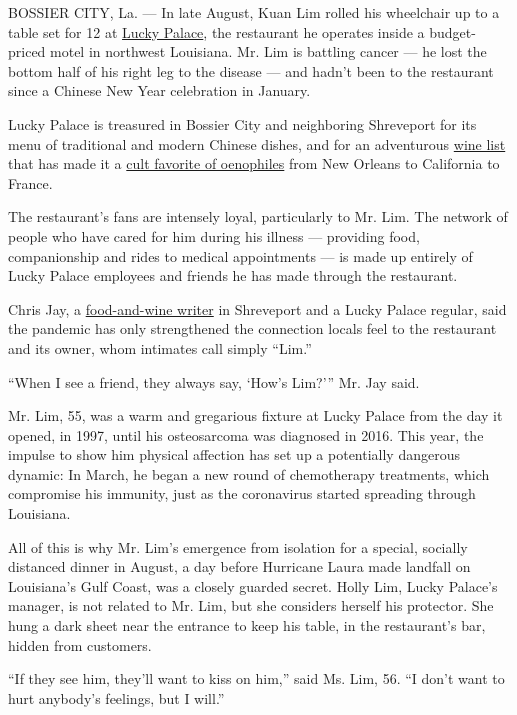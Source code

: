 BOSSIER CITY, La. --- In late August, Kuan Lim rolled his wheelchair up
to a table set for 12 at \href{https://lucky-palace.com}{Lucky Palace},
the restaurant he operates inside a budget-priced motel in northwest
Louisiana. Mr. Lim is battling cancer --- he lost the bottom half of his
right leg to the disease --- and hadn't been to the restaurant since a
Chinese New Year celebration in January.

Lucky Palace is treasured in Bossier City and neighboring Shreveport for
its menu of traditional and modern Chinese dishes, and for an
adventurous
\href{https://lucky-palace.com/wine-list-by-the-bottle/}{wine list} that
has made it a
\href{https://gardenandgun.com/articles/lucky-palace-louisiana-gem/}{cult
favorite of oenophiles} from New Orleans to California to France.

The restaurant's fans are intensely loyal, particularly to Mr. Lim. The
network of people who have cared for him during his illness ---
providing food, companionship and rides to medical appointments --- is
made up entirely of Lucky Palace employees and friends he has made
through the restaurant.

Chris Jay, a \href{https://stuffedandbusted.com/}{food-and-wine writer}
in Shreveport and a Lucky Palace regular, said the pandemic has only
strengthened the connection locals feel to the restaurant and its owner,
whom intimates call simply ``Lim.''

``When I see a friend, they always say, `How's Lim?''' Mr. Jay said.

Mr. Lim, 55, was a warm and gregarious fixture at Lucky Palace from the
day it opened, in 1997, until his osteosarcoma was diagnosed in 2016.
This year, the impulse to show him physical affection has set up a
potentially dangerous dynamic: In March, he began a new round of
chemotherapy treatments, which compromise his immunity, just as the
coronavirus started spreading through Louisiana.

All of this is why Mr. Lim's emergence from isolation for a special,
socially distanced dinner in August, a day before Hurricane Laura made
landfall on Louisiana's Gulf Coast, was a closely guarded secret. Holly
Lim, Lucky Palace's manager, is not related to Mr. Lim, but she
considers herself his protector. She hung a dark sheet near the entrance
to keep his table, in the restaurant's bar, hidden from customers.

``If they see him, they'll want to kiss on him,'' said Ms. Lim, 56. ``I
don't want to hurt anybody's feelings, but I will.''

